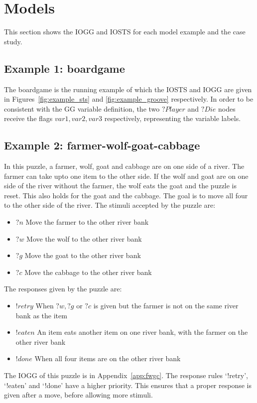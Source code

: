 \section{Models}\label{sec:model-examples}
This section shows the IOGG and IOSTS for each model example and the case study. 

\subsection{Example 1: boardgame}
The boardgame is the running example of which the IOSTS and IOGG are given in Figures~\ref{fig:example_sts} and \ref{fig:example_groove} respectively. In order to be consistent with the GG variable definition, the two $?Player$ and $?Die$ nodes receive the flags $\mathit{var1, var2, var3}$ respectively, representing the variable labels.

\subsection{Example 2: farmer-wolf-goat-cabbage}
In this puzzle, a farmer, wolf, goat and cabbage are on one side of a river. The farmer can take upto one item to the other side. If the wolf and goat are on one side of the river without the farmer, the wolf eats the goat and the puzzle is reset. This also holds for the goat and the cabbage. The goal is to move all four to the other side of the river. The stimuli accepted by the puzzle are:
\begin{itemize}
\item $?n$ Move the farmer to the other river bank
\item $?w$ Move the wolf to the other river bank
\item $?g$ Move the goat to the other river bank
\item $?c$ Move the cabbage to the other river bank
\end{itemize}
The responses given by the puzzle are:
\begin{itemize}
\item $!retry$ When $?w, ?g$ or $?c$ is given but the farmer is not on the same river bank as the item
\item $!eaten$ An item eats another item on one river bank, with the farmer on the other river bank 
\item $!done$ When all four items are on the other river bank
\end{itemize}

The IOGG of this puzzle is in Appendix~\ref{app:fwgc}. The response rules `!retry', `!eaten' and `!done' have a higher priority. This ensures that a proper response is given after a move, before allowing more stimuli.

